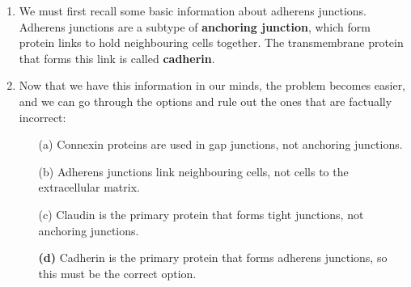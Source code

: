 \documentclass[11pt]{article}
\begin{document}
\begin{enumerate}
\item We must first recall some basic information about adherens junctions. Adherens junctions are a subtype of \textbf{anchoring junction}, which form protein links to hold neighbouring cells together. The transmembrane protein that forms this link is called \textbf{cadherin}.
\item Now that we have this information in our minds, the problem becomes easier, and we can go through the options and rule out the ones that are factually incorrect:
	\begin{itemize}
	\item[(a)] Connexin proteins are used in gap junctions, not anchoring junctions. 
	\item[(b)] Adherens junctions link neighbouring cells, not cells to the extracellular matrix. 
	\item[(c)] Claudin is the primary protein that forms tight junctions, not anchoring junctions. 
	\item[\textbf{(d)}] Cadherin is the primary protein that forms adherens junctions, so this must be the correct option.
	\end{itemize}
\end{enumerate} 
\end{document}
